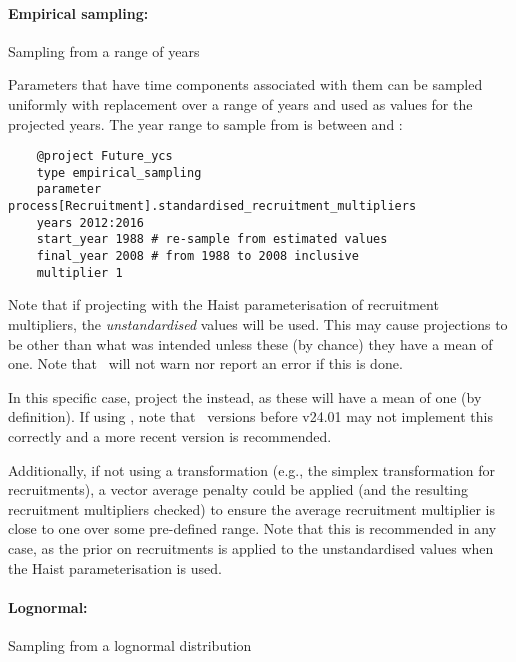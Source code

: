 \paragraph[Empirical sampling]{Empirical sampling:} Sampling from a range of years  \label{sec:Project-EmpiricalSampling}

Parameters that have time components associated with them can be sampled uniformly with replacement over a range of years and used as values for the projected years. The year range to sample from is between  and :

{\small{\begin{verbatim}
	@project Future_ycs
	type empirical_sampling
	parameter process[Recruitment].standardised_recruitment_multipliers
	years 2012:2016
	start_year 1988 # re-sample from estimated values
	final_year 2008 # from 1988 to 2008 inclusive
	multiplier 1
\end{verbatim}}}

Note that if projecting  with the Haist parameterisation of recruitment multipliers, the \emph{unstandardised} values will be used. This may cause projections to be other than what was intended unless these (by chance) they have a mean of one. Note that \CNAME\ will not warn nor report an error if this is done. 

In this specific case, project the  instead, as these will have a mean of one (by definition). If using , note that \CNAME\ versions before v24.01 may not implement this correctly and a more recent version is recommended. 

Additionally, if not using a transformation (e.g., the simplex transformation for recruitments), a vector average penalty could be applied (and the resulting recruitment multipliers checked) to ensure the average recruitment multiplier is close to one over some pre-defined range. Note that this is recommended in any case, as the prior on recruitments is applied to the unstandardised values when the Haist parameterisation is used. 

\paragraph[Lognormal]{Lognormal:} Sampling from a lognormal distribution  \label{sec:Project-LogNormal}

